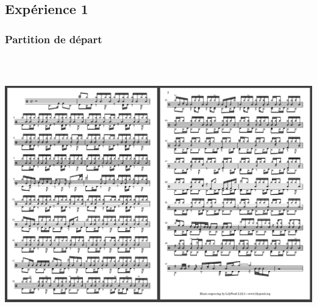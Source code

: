 \subsection{Expérience 1}
\subsubsection{Partition de départ}
\includegraphics[height=120mm, width=160mm]{z_images/3_experimentations/experience_1/partition.png}
